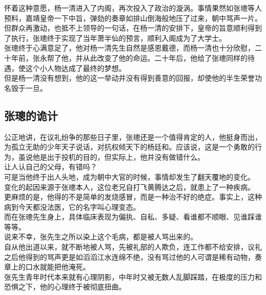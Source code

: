 \begin{multicols}{\theparacolNo}
怀着这种意愿，杨一清进入了内阁，再次投入了政治的漩涡。事情果然如张璁等人预料，嘉靖皇帝一下中旨，弹劾的奏章如排山倒海般地压了过来，朝中骂声一片。\\

但群众再激动，也抵不上领导的一句话，在杨一清的安排下，皇帝的旨意顺利得到了执行，张璁终于实现了当年萧半仙的预言，顺利入阁成为了大学士。\\

张璁终于心满意足了，他对杨一清先生自然是感恩戴德，而杨一清也十分欣慰，二十年前，张永帮了他，并从此改变了他的命运。二十年后，他给了张璁同样的待遇，使这个小人物达成了最终的梦想。\\

但是杨一清没有想到，他的这一举动并没有得到善意的回报，却使他的半生荣誉功名毁于一旦。\\

\subsection{张璁的诡计}
公正地讲，在议礼纷争的那些日子里，张璁还是一个值得肯定的人，他挺身而出，为孤立无助的少年天子说话，对抗权倾天下的杨廷和。应该说，这是一个勇敢的行为，虽说他是出于投机的目的，但实际上，他并没有做错什么。\\

让人认自己的父母，有错吗？\\

可是当他终于出人头地，成为朝中大官的时候，事情却发生了翻天覆地的变化。\\

变化的起因来源于张璁本人，这位老兄自打飞黄腾达之后，就患上了一种疾病。\\

更麻烦的是，他得的不是简单的发烧感冒，而是一种治不好的绝症。事实上，这种病到今天都没法医，它的名字叫心理变态。\\

而在张璁先生身上，具体临床表现为偏执、自私、多疑、看谁都不顺眼、见谁踩谁等等。\\

说来不幸，张先生之所以染上这个毛病，都是被人骂出来的。\\

自从他出道以来，就不断地被人骂，先被礼部的人欺负，连工作都不给安排，议礼之后他得到的骂声更是如滔滔江水连绵不绝，没有骂过他的人可谓是稀有动物，奏章上的口水就能把他淹死。\\

张先生青年时代本来就有心理阴影，中年时又被无数人乱脚踩踏，在极度的压力和恐惧之下，他的心理终于被彻底扭曲。\\


\end{multicols}
